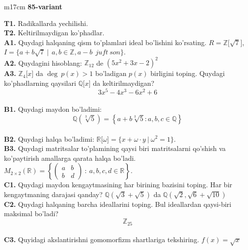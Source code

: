 \documentclass{article}
\begin{document}
\begin{tabular}{m{17cm}}
\textbf{85-variant}
\newline

\textbf{T1.} Radikallarda yechilishi. \\
\textbf{T2.} Keltirilmaydigan ko'phadlar. \\
\textbf{A1.} Quydagi halqaning qism to'plamlari ideal bo'lishini ko'rsating.
\(R\mathbb{= Z\lbrack}\sqrt{7}\rbrack\), \(I = \{ a + b\sqrt{7}\ |\ \ a,b \in \mathbb{Z,}a - b\ \ juft\ son\}\). \\
\textbf{A2.} Quydagini hisoblang:
\(\mathbb{Z}_{12}\) de \(\left( 5x^{2} + 3x - 2 \right)^{2}\) \\
\textbf{A3.} \(\mathbb{Z}_{4}\lbrack x\rbrack\) da \(\deg\ p(x) > 1\) bo'ladigan \(p(x)\) birligini toping. Quydagi ko'phadlarning qaysilari \(\mathbb{Q\lbrack}x\rbrack\) da keltirilmaydigan?
\[3x^{5} - 4x^{3} - 6x^{2} + 6\] \\
\textbf{B1.} Quydagi maydon bo'ladimi:
\[\mathbb{Q}\left( \sqrt[3]{5} \right) = \left\{ a + b\sqrt[3]{5}:a,b,c \in \mathbb{Q} \right\}\] \\
\textbf{B2.} Quydagi halqa bo'ladimi:
\(\mathbb{R\lbrack}\omega\rbrack = \{ x + \omega \cdot y\ |\ \omega^{2} = 1\}\). \\
\textbf{B3.} Quydagi matritsalar to'plamining qaysi biri matritsalarni qo'shish va ko'paytirish amallarga qarata halqa bo'ladi.
\(M_{2 \times 2}\mathbb{(R) =}\left\{ \begin{pmatrix}
a & b \\
b & d
\end{pmatrix}\ :\ a,b,c,d \in \mathbb{R} \right\}\). \\
\textbf{C1.} Quydagi maydon kengaytmasining har birining bazisini toping. Har bir kengaytmaning darajasi qanday?
\(\mathbb{Q}\left( \sqrt{3} + \sqrt{5} \right)\) da \(\mathbb{Q}\left( \sqrt{2},\sqrt{6} + \sqrt{10} \right)\) \\
\textbf{C2.} Quydagi halqaning barcha ideallarini toping. Bul ideallardan qaysi-biri maksimal bo'ladi?
\[\mathbb{Z}_{25}\] \\
\textbf{C3.} Quyidagi akslantirishni gomomorfizm shartlariga tekshiring. \(f(x) = \sqrt{x}\) \\

\end{tabular}
\vspace{1cm}
\end{document}
